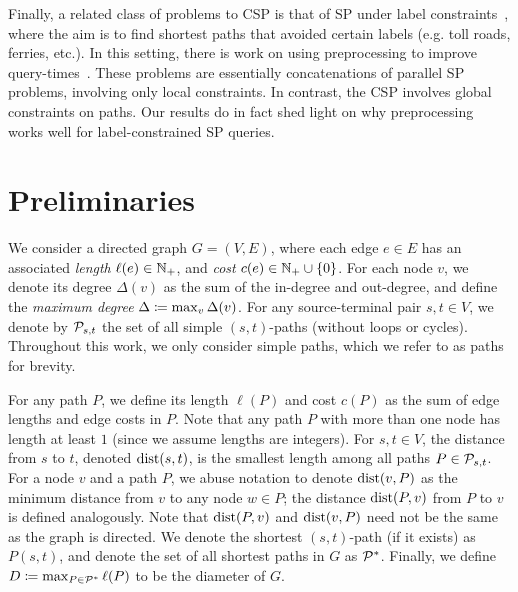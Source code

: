 \documentclass[opre,nonblindrev]{informs3} %
\begin{document}
Finally, a related class of problems to CSP is that of SP under label constraints~\citep{language_csp}, where the aim is to find shortest paths that avoided certain labels (e.g. toll roads, ferries, etc.). 
In this setting, there is work on using preprocessing to improve query-times~\citep{rice_csp}.
These problems are essentially concatenations of parallel SP problems, involving only local constraints. 
In contrast, the CSP involves global constraints on paths.
Our results do in fact shed light on why preprocessing works well for label-constrained SP queries.

\section{Preliminaries}
\label{sec:prelim}
\label{ssec:basic}
We consider a directed graph $G=(V,E)$, where each edge $e\in E$ has an associated \emph{length} $\ell(e)\in\mathbb{N}_+$, and \emph{cost} $c(e)\in\mathbb{N}_+\cup\{0\}$.
For each node $v$, we denote its degree $\Delta(v)$ as the sum of the in-degree and out-degree, and define the \emph{maximum degree} $\Delta \coloneqq \max_v\Delta(v)$.
For any source-terminal pair $s,t\in V$, we denote by $\mathcal{P}_{s,t}$ the set of all simple $(s,t)$-paths (without loops or cycles). 
Throughout this work, we only consider simple paths, which we refer to as paths for brevity.

For any path $P$, we define its length $\ell(P)$ and cost $c(P)$ as the sum of edge lengths and edge costs in $P$. 
Note that any path $P$ with more than one node has length at least $1$ (since we assume lengths are integers).
For $s,t\in V$, the distance from $s$ to $t$, denoted $\mbox{dist}(s,t)$, is the smallest length among all paths $P\in\mathcal{P}_{s,t}$.
For a node $v$ and a path $P$, we abuse notation to denote $\mbox{dist}(v,P)$ as the minimum distance from $v$ to any node $w\in P$; the distance $\mbox{dist}(P,v)$ from $P$ to $v$ is defined analogously.
Note that  $\mbox{dist}(P,v)$ and  $\mbox{dist}(v,P)$ need not be the same as the graph is directed.
We denote the shortest $(s,t)$-path (if it exists) as $P(s,t)$, and denote the set of all shortest paths in $G$ as $\mathcal{P}^*$.
Finally, we define $D\coloneqq\max_{P\in\mathcal{P}^*}\ell(P)$ to be the diameter of $G$.
\end{document}
